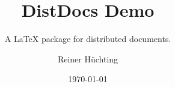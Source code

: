\documentclass{scrartcl}
\begin{document}
  \title{DistDocs Demo}
  \subtitle{A \LaTeX{} package for distributed documents.}
  \author{Reiner Hüchting}
  \date{\today}

  \maketitle

  \hellodistdocs
\end{document}
